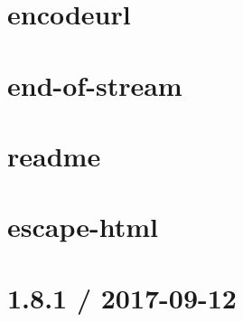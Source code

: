 \let\mypdfximage\pdfximage\def\pdfximage{\immediate\mypdfximage}\documentclass[twoside]{book}
\newcommand{\+}{\discretionary{\mbox{\scriptsize$\hookleftarrow$}}{}{}}
\begin{document}
\chapter{encodeurl}
\label{md__c_1__git_hub__p_r_o_y_e_c_t_o-_i_i_i-_g_o_t_rest-api-node-mysql_node_modules_encodeurl__r_e_a_d_m_e}

\chapter{end-\/of-\/stream}
\label{md__c_1__git_hub__p_r_o_y_e_c_t_o-_i_i_i-_g_o_t_rest-api-node-mysql_node_modules_end-of-stream__r_e_a_d_m_e}

\chapter{readme}
\label{md__c_1__git_hub__p_r_o_y_e_c_t_o-_i_i_i-_g_o_t_rest-api-node-mysql_node_modules_escape-goat_readme}

\chapter{escape-\/html}
\label{md__c_1__git_hub__p_r_o_y_e_c_t_o-_i_i_i-_g_o_t_rest-api-node-mysql_node_modules_escape-html__readme}

\chapter{1.8.1 / 2017-\/09-\/12}
\label{md__c_1__git_hub__p_r_o_y_e_c_t_o-_i_i_i-_g_o_t_rest-api-node-mysql_node_modules_etag__h_i_s_t_o_r_y}

\end{document}
